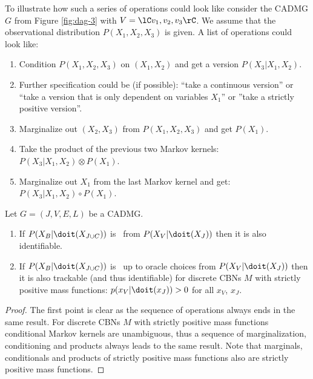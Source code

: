 \begin{Eg}
    To illustrate how such a series of operations could look like
    consider the CADMG $G$ from Figure \ref{fig:dag-3} with $V=\lC v_1,v_2,v_3 \rC$. 
    We assume that the observational distribution $P(X_1,X_2,X_3)$ is given.
    A list of operations could look like:
    \begin{enumerate}
        \item Condition $P(X_1,X_2,X_3)$ on $(X_1,X_2)$ and get a version $P(X_3|X_1,X_2)$. 
        \item[] Further specification could be (if possible): ``take a continuous version'' or ``take a version that is only dependent on variables $X_1$'' or ''take a strictly positive version''.
        \item Marginalize out $(X_2,X_3)$ from $P(X_1,X_2,X_3)$ and get $P(X_1)$.
        \item Take the product of the previous two Markov kernels: $P(X_3|X_1,X_2) \otimes P(X_1)$.
        \item Marginalize out $X_1$ from the last Markov kernel and get: $P(X_3|X_1,X_2) \circ P(X_1)$.
    \end{enumerate}
\end{Eg}

\begin{Lem}
    Let $G=(J,V,E,L)$ be a CADMG.
    \begin{enumerate} 
        \item If $P(X_B|\doit(X_{J \cup C}))$ is \trackable\ from $P(X_V|\doit(X_J))$ then it is also identifiable.
        \item If $P(X_B|\doit(X_{J \cup C}))$ is \trackable\ up to oracle choices from $P(X_V|\doit(X_J))$ 
            then it is also trackable (and thus identifiable) for discrete CBNs $M$ with strictly positive mass functions: 
    $p(x_V|\doit(x_J))>0$ for all $x_V$, $x_J$.
    \end{enumerate}
    \begin{proof}
        The first point is clear as the sequence of operations always ends in the same result.
        For discrete CBNs $M$ with strictly positive mass functions conditional Markov kernels are unambiguous, thus a sequence
        of marginalization, conditioning and products always leads to the same result.
        Note that marginals, conditionals and products of strictly positive mass functions also are strictly positive mass functions.
    \end{proof}
\end{Lem}



